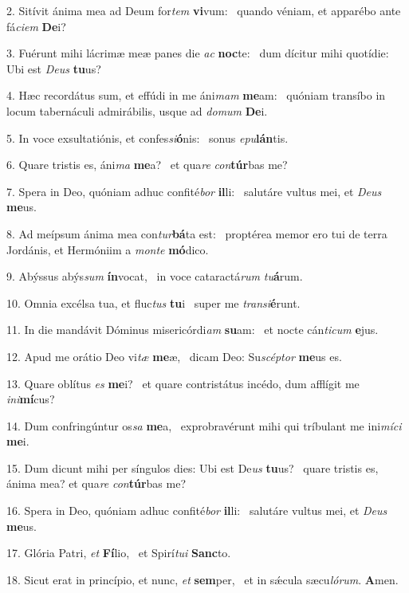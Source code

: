 2. Sitívit ánima mea ad Deum for\textit{tem} \textbf{vi}vum: \ast\  quando véniam, et apparébo ante fá\textit{ci}\textit{em} \textbf{De}i?\

3. Fuérunt mihi lácrimæ meæ panes die \textit{ac} \textbf{noc}te: \ast\  dum dícitur mihi quotídie: Ubi est \textit{De}\textit{us} \textbf{tu}us?\

4. Hæc recordátus sum, et effúdi in me áni\textit{mam} \textbf{me}am: \ast\  quóniam transíbo in locum tabernáculi admirábilis, usque ad \textit{do}\textit{mum} \textbf{De}i.\

5. In voce exsultatiónis, et confes\textit{si}\textbf{ó}nis: \ast\  sonus \textit{e}\textit{pu}\textbf{lán}tis.\

6. Quare tristis es, áni\textit{ma} \textbf{me}a? \ast\  et qua\textit{re} \textit{con}\textbf{túr}bas me?\

7. Spera in Deo, quóniam adhuc confité\textit{bor} \textbf{il}li: \ast\  salutáre vultus mei, et \textit{De}\textit{us} \textbf{me}us.\

8. Ad meípsum ánima mea con\textit{tur}\textbf{bá}ta est: \ast\  proptérea memor ero tui de terra Jordánis, et Hermóniim a \textit{mon}\textit{te} \textbf{mó}dico.\

9. Abýssus abýs\textit{sum} \textbf{ín}vocat, \ast\  in voce cataractá\textit{rum} \textit{tu}\textbf{á}rum.\

10. Omnia excélsa tua, et fluc\textit{tus} \textbf{tu}i \ast\  super me \textit{trans}\textit{i}\textbf{é}runt.\

11. In die mandávit Dóminus misericórdi\textit{am} \textbf{su}am: \ast\  et nocte cán\textit{ti}\textit{cum} \textbf{e}jus.\

12. Apud me orátio Deo vi\textit{tæ} \textbf{me}æ, \ast\  dicam Deo: Su\textit{scép}\textit{tor} \textbf{me}us es.\

13. Quare oblítus \textit{es} \textbf{me}i? \ast\  et quare contristátus incédo, dum afflígit me \textit{in}\textit{i}\textbf{mí}cus?\

14. Dum confringúntur os\textit{sa} \textbf{me}a, \ast\  exprobravérunt mihi qui tríbulant me ini\textit{mí}\textit{ci} \textbf{me}i.\

15. Dum dicunt mihi per síngulos dies: Ubi est De\textit{us} \textbf{tu}us? \ast\  quare tristis es, ánima mea? et qua\textit{re} \textit{con}\textbf{túr}bas me?\

16. Spera in Deo, quóniam adhuc confité\textit{bor} \textbf{il}li: \ast\  salutáre vultus mei, et \textit{De}\textit{us} \textbf{me}us.\

17. Glória Patri, \textit{et} \textbf{Fí}lio, \ast\  et Spirí\textit{tu}\textit{i} \textbf{Sanc}to.\

18. Sicut erat in princípio, et nunc, \textit{et} \textbf{sem}per, \ast\  et in sǽcula sæcu\textit{ló}\textit{rum}. \textbf{A}men.\

